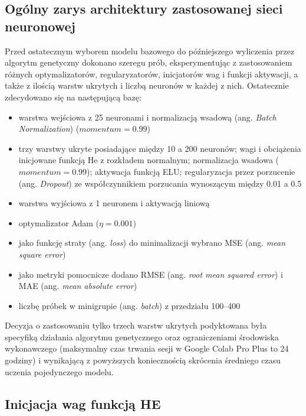 \documentclass[a4paper,11pt]{article}
\begin{document}
    \subsection{Ogólny zarys architektury zastosowanej sieci neuronowej}

    Przed ostatecznym wyborem modelu bazowego do późniejszego wyliczenia przez algorytm genetyczny dokonano szeregu prób, eksperymentując z zastosowaniem różnych optymalizatorów, regularyzatorów, inicjatorów wag i funkcji aktywacji, a także z ilością warstw ukrytych i liczbą neuronów w każdej z nich. Ostatecznie zdecydowano się na następującą bazę:
    \begin{itemize}
        \item warstwa wejściowa z 25 neuronami i normalizacją wsadową (ang. \textit{Batch Normalization}) ($momentum = 0.99$)
        \item trzy warstwy ukryte posiadające między 10 a 200 neuronów; wagi i obciążenia inicjowane funkcją He z rozkładem normalnym; normalizacja wsadowa ($momentum = 0.99$); aktywacja funkcją ELU; regularyzacja przez porzucenie (ang. \textit{Dropout}) ze współczynnikiem porzucania wynoszącym między 0.01 a 0.5
        \item warstwa wyjściowa z 1 neuronem i aktywacją liniową
        \item optymalizator Adam ($\eta = 0.001$)
        \item jako funkcję straty (ang. \textit{loss}) do minimalizacji wybrano MSE (ang. \textit{mean square error})
        \item jako metryki pomocnicze dodano RMSE (ang. \textit{root mean squared error}) i MAE (ang. \textit{mean absolute error})
        \item liczbę próbek w minigrupie (ang. \textit{batch}) z przedziału 100--400
    \end{itemize}

    \bigskip

    Decyzja o zastosowaniu tylko trzech warstw ukrytych podyktowana była specyfiką działania algorytmu genetycznego oraz ograniczeniami środowiska wykonawczego (maksymalny czas trwania sesji w Google Colab Pro Plus to 24 godziny) i wynikającą z powyższych koniecznością skrócenia średniego czasu uczenia pojedynczego modelu.

    \subsection{Inicjacja wag funkcją HE}
\end{document}
